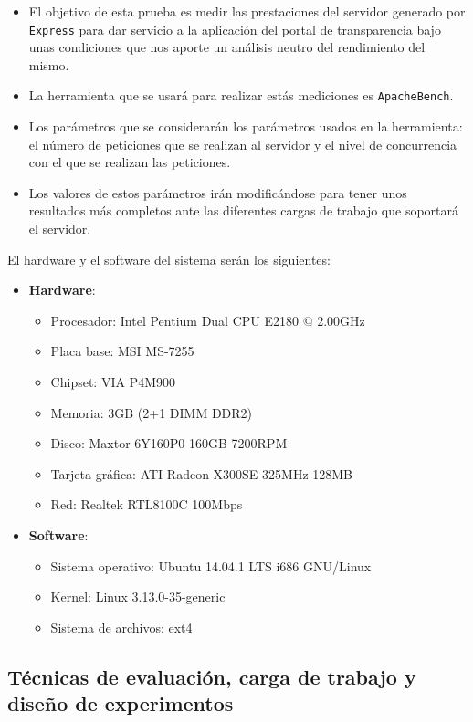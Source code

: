 \begin{itemize}
	\item El objetivo de esta prueba es medir las prestaciones del servidor generado por {\tt Express} para dar servicio a la aplicación del portal de transparencia bajo unas condiciones que nos aporte un análisis neutro del rendimiento del mismo.
	\item La herramienta que se usará para realizar estás mediciones es {\tt ApacheBench}.
	\item Los parámetros que se considerarán los parámetros usados en la herramienta: el número de peticiones que se realizan al servidor y el nivel de concurrencia con el que se realizan las peticiones.
	\item Los valores de estos parámetros irán modificándose para tener unos resultados más completos ante las diferentes cargas de trabajo que soportará el servidor.
\end{itemize}

El hardware y el software del sistema serán los siguientes:

\begin{itemize}
	\item \textbf{Hardware}:
	\begin{itemize}
		\item Procesador: Intel Pentium Dual CPU E2180 @ 2.00GHz
		\item Placa base: MSI MS-7255
		\item Chipset: VIA P4M900
		\item Memoria: 3GB (2+1 DIMM DDR2)
		\item Disco: Maxtor 6Y160P0 160GB 7200RPM
		\item Tarjeta gráfica: ATI Radeon X300SE 325MHz 128MB
		\item Red: Realtek RTL8100C 100Mbps
	\end{itemize}
	\item \textbf{Software}:
	\begin{itemize}
		\item Sistema operativo: Ubuntu 14.04.1 LTS i686 GNU/Linux
		\item Kernel: Linux 3.13.0-35-generic
		\item Sistema de archivos: ext4
	\end{itemize}
\end{itemize}

\newpage
\subsection{Técnicas de evaluación, carga de trabajo y diseño de experimentos}

